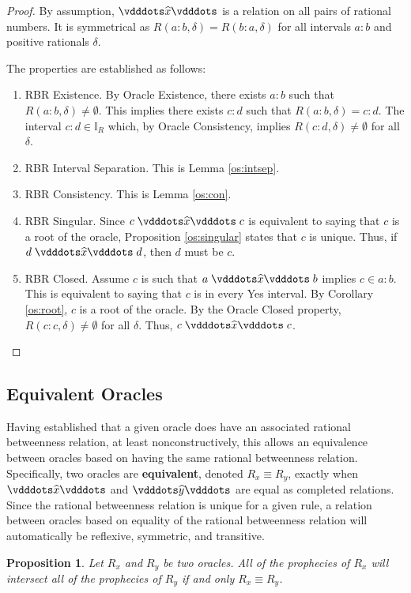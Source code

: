 \documentclass[12pt]{article}
\newtheorem{proposition}{Proposition}[section]
\begin{document}
\begin{proof}
    By assumption, $\xora$ is a relation on all pairs of rational numbers. It is symmetrical as $R(a:b, \delta) = R(b:a, \delta)$ for all intervals $a:b$ and positive rationals $\delta$.

    The properties are established as follows: 
    \begin{enumerate}
        \item RBR Existence. By Oracle Existence, there exists $a:b$ such that $R(a:b, \delta) \neq \emptyset$. This implies there exists $c:d$ such that $R(a:b, \delta) = c:d$. The interval $c:d \in \mathbb{I}_R$ which, by Oracle Consistency, implies $R(c:d, \delta) \neq \emptyset$ for all $\delta$.  
        \item RBR Interval Separation. This is Lemma \ref{os:intsep}.
        \item RBR Consistency. This is Lemma \ref{os:con}.
        \item RBR Singular. Since $c \xora c$ is equivalent to saying that $c$ is a root of the oracle, Proposition \ref{os:singular}  states that $c$ is unique. Thus, if $d \xora d$, then $d$ must be $c$. 
        \item RBR Closed. Assume $c$ is such that $a \xora b$ implies $c \in a:b$. This is equivalent to saying that $c$ is in every Yes interval. By Corollary \ref{os:root}, $c$ is a root of the oracle. By the Oracle Closed property, $R(c:c, \delta) \neq \emptyset$ for all $\delta$. Thus, $c \xora c$.
    \end{enumerate}
\end{proof}

\subsection{Equivalent Oracles}

Having established that a given oracle does have an associated rational betweenness relation, at least nonconstructively, this allows an equivalence between oracles based on having the same rational betweenness relation. Specifically, two oracles are \textbf{equivalent}, denoted $R_x \equiv R_y$, exactly when $\xora$ and $\xora[y]$ are equal as completed relations. Since the rational betweenness relation is unique for a given rule, a relation between oracles based on equality of the rational betweenness relation will automatically be reflexive, symmetric, and transitive. 

 \begin{proposition}
Let $R_x$ and $R_y$ be two oracles. All of the prophecies of $R_x$ will intersect all of the prophecies of $R_y$ if and only $R_x \equiv R_y$.
\end{proposition}
\end{document}
